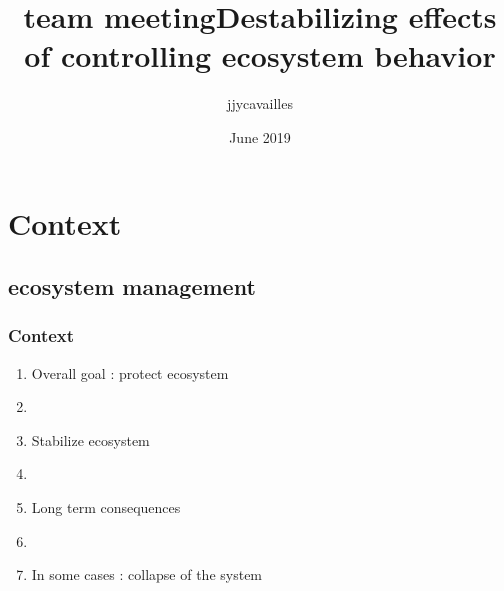 \documentclass{beamer}
\title{team meeting}
\author{jjycavailles }
\date{June 2019}
\title{Destabilizing effects \\ of controlling ecosystem behavior}
\subtitle{\it{ \rule{\linewidth}{0.5mm} \\ [0.4cm] \\ Jérôme Cavaillès}}
\author[Jérôme Cavaillès, Yuval Zelnik]{%
  \texorpdfstring{%
    \begin{columns}
      \column{.33\linewidth}
      \centering
      Supervisor \\ \it{Yuval Zelnik} \\ \it{Michel Loreau}
      \column{.33\linewidth}
      \centering
    University \\ INSA Toulouse \\ Paul Sabatier     
    \end{columns}
 }
 {Author 1, Author 2, Author 3}
}
\institute{%
  \texorpdfstring{%
    \begin{columns}
      \column{.9\linewidth}
      \centering
    \end{columns}
 }
 {Author 1, Author 2, Author 3}
}
\begin{document}
\begin{frame}[plain,t]
\titlepage
\end{frame}






\section{Context}

\subsection{ecosystem management}
\begin{frame}
\frametitle{Context} %
\begin{enumerate}
\item Overall goal : protect ecosystem
\item[]
\item Stabilize ecosystem 
\item[]
\item Long term consequences 
\item[]
\item In some cases : collapse of the system 
\end{enumerate}
\end{frame}
\end{document}
